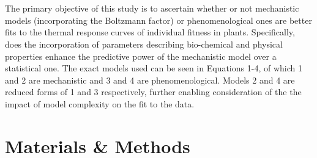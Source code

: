 \documentclass[11pt]{article}
\begin{document}
\\
\\
The primary objective of this study is to ascertain whether or not mechanistic models (incorporating the Boltzmann factor) or phenomenological ones are better fits to the thermal response curves of individual fitness in plants. Specifically, does the incorporation of parameters describing bio-chemical and physical properties enhance the predictive power of the mechanistic model over a statistical one. The exact models used can be seen in Equations 1-4, of which 1 and 2 are mechanistic and 3 and 4 are phenomenological. Models 2 and 4 are reduced forms of 1 and 3 respectively, further enabling  consideration of the the impact of model complexity on the fit to the data.
\section{Materials \& Methods}
\end{document}
